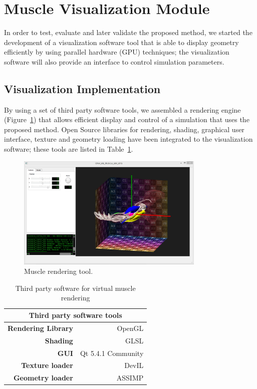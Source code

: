 \section{Muscle Visualization Module}
In order to test, evaluate and later validate the proposed method, we started the development of a visualization software tool that is able to display geometry efficiently by using parallel hardware (GPU) techniques; the visualization software will also provide an interface to control simulation parameters.


\subsection{Visualization Implementation}

By using a set of third party software tools, we assembled a rendering engine (Figure~\ref{fig:muscleVis}) that allows efficient display and control of a simulation that uses the proposed method. Open Source libraries for rendering, shading, graphical user interface, texture and geometry loading have been integrated to the visualization software; these tools are listed in Table~\ref{tab:thirdSw}.

\begin{figure}[!t]
	\centering
		\includegraphics[width=0.8\textwidth]{./Figures/viewConfig.jpg}
	\caption[Muscle rendering.]{Muscle rendering tool.}
	\label{fig:muscleVis}
\end{figure}

\begin{table}[htbp]
  \centering
  \caption{Third party software for virtual muscle rendering}
    \begin{tabular}{rr}
    \toprule
    \multicolumn{2}{c}{\textbf{Third party software tools}} \\
    \midrule
    \textbf{Rendering Library} & OpenGL \\
    \textbf{Shading} & GLSL \\
    \textbf{GUI} & Qt 5.4.1 Community \\
    \textbf{Texture loader} & DevIL \\
    \textbf{Geometry loader} & ASSIMP \\
    \bottomrule
    \end{tabular}%
  \label{tab:thirdSw}%
\end{table}%


